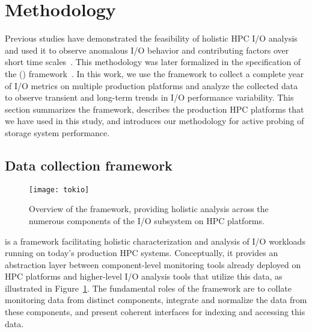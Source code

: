 \section{Methodology}\label{sec:methods}

Previous studies have demonstrated the feasibility of 
holistic HPC I/O analysis and used it to observe anomalous I/O behavior and
contributing factors over short time scales~\cite{Lockwood2017}. This methodology was later formalized in the specification of the \tokio (\tokiolong) framework~\cite{Lockwood2018tokio}. 
In this work, we use 
the \tokio framework
to collect 
a complete
year of I/O metrics on multiple production platforms and analyze the collected data to observe transient and long-term trends in I/O performance variability.  This section
summarizes the \tokio framework, 
describes the production HPC platforms that we have 
used in this study,
and introduces our methodology for active probing of storage system
performance.

\subsection{Data collection framework}\label{sec:methods/tokio}


\begin{figure}
    \centering
    \texttt{[image: tokio]}
        \vspace{-.1in}
    \caption{Overview of the \tokio framework, providing holistic analysis across the numerous components of the I/O subsystem on HPC platforms.}
    \label{fig:tokio-framework}
\end{figure}

\tokio is a framework facilitating holistic characterization and analysis of I/O workloads running on today's production HPC systems. Conceptually, it provides an abstraction layer between component-level monitoring tools already deployed on HPC platforms and higher-level I/O analysis tools that utilize this data, as illustrated in  Figure~\ref{fig:tokio-framework}. The fundamental roles of the \tokio framework are to collate monitoring data from distinct components, integrate and normalize the data from these components, and present coherent interfaces for indexing and accessing this data.

